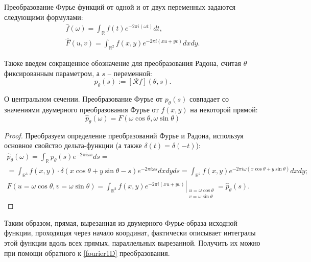 
Преобразование Фурье функций от одной и от двух переменных задаются следующими формулами:
\begin{gather}
\label{fourier1D}
    \hat{f}(\omega) = \int_{\mathbb{R}} f(t) e^{-2\pi i (\omega t)} dt,\\
\label{fourier2D}
    \hat{F}(u, v) = \int_{\mathbb{R}^2} f(x, y) e^{-2\pi i (xu + yv)} dx dy.
\end{gather}

Также введем сокращенное обозначение для преобразования Радона, считая $\theta$ фиксированным параметром, а $s$ -- переменной:
\begin{equation*}
    p_\theta(s) := \left[ \mathcal{R}f \right]\left( \theta, s \right).
\end{equation*}

\begin{theorem}{О центральном сечении.}
\label{fourier_slice_thm}
    Преобразование Фурье от $p_\theta(s)$ совпадает со значениями двумерного преобразования Фурье от $f(x, y)$ на некоторой прямой:
    \begin{equation*}
        \hat{p}_\theta(\omega) = F(\omega\cos\theta, \omega\sin\theta)
    \end{equation*}
\end{theorem}
\begin{proof}
    Преобразуем определение преобразований Фурье и Радона, используя основное свойство дельта-функции (а также $\delta(t) = \delta(-t)$):
    \begin{gather*}
        \hat{p}_\theta(\omega) =
        \int_{\mathbb{R}} p_\theta(s) e^{-2\pi i \omega s} ds =\\=
        \int_{\mathbb{R}^3} f(x, y) \cdot \delta(x\cos\theta + y\sin\theta - s) e^{-2\pi i \omega s} dx dy ds =
        \int_{\mathbb{R}^2} f(x, y) e^{-2\pi i \omega \left( x\cos\theta + y\sin\theta \right)} dx dy;\\
        F(u=\omega\cos\theta, v=\omega\sin\theta) =
        \left.\int_{\mathbb{R}^2} f(x, y) e^{-2\pi i \left( x u + y v \right)}\right|_{\substack{u=\omega\cos\theta\\v=\omega\sin\theta}} =
        \hat{p}_\theta(s).
    \end{gather*}
\end{proof}

Таким образом, прямая, вырезанная из двумерного Фурье-образа исходной функции, проходящая через начало координат, фактически описывает интегралы этой функции вдоль всех прямых, параллельных вырезанной. Получить их можно при помощи обратного к \eqref{fourier1D} преобразования.
